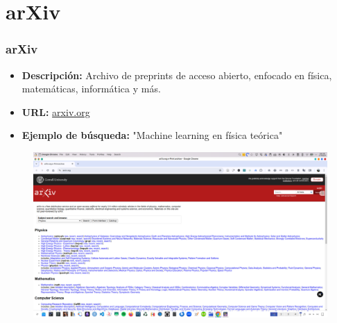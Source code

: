 \documentclass[
11pt, %
]{beamer}
\begin{document}
\section{arXiv}
\begin{frame}
	\frametitle{arXiv}
	\begin{itemize}
		\item \textbf{Descripción:} Archivo de preprints de acceso abierto, enfocado en física, matemáticas, informática y más.
		\item \textbf{URL:} \href{https://arxiv.org}{arxiv.org}
		\item \textbf{Ejemplo de búsqueda:} "Machine learning en física teórica"
	\end{itemize}
				\begin{figure}
		\centering
		\includegraphics[width=0.9\linewidth]{images/arxiv.png}
		\label{fig:screenshot010}
	\end{figure}
\end{frame}

\end{document}
